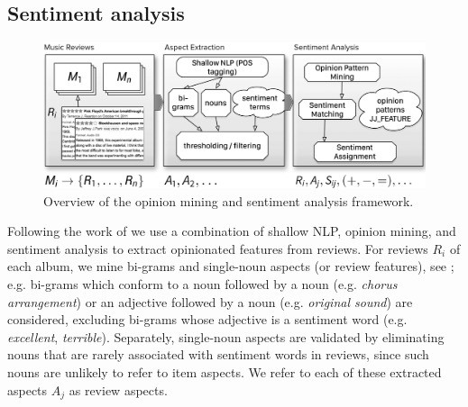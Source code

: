 \subsection{Sentiment analysis}
\label{sec:musicology:sentiment}

\begin{figure}
\includegraphics[width=\columnwidth]{ch05_musicology_pics/omf_bn.pdf}
\caption{Overview of the opinion mining and sentiment analysis framework.}
\label{fig:musicology:OMF}
\end{figure}

Following the work of \cite{DongSOS13,DongOS14} we use a combination of shallow NLP, opinion mining, and sentiment analysis to extract opinionated features from reviews. For reviews $R_{i}$ of each album, we mine bi-grams and single-noun aspects (or review features), see \cite{Hu2004}; e.g. bi-grams which conform to a noun followed by a noun (e.g. \emph{chorus arrangement}) or an adjective followed by a noun (e.g. \emph{original sound}) are considered, excluding bi-grams whose adjective is a sentiment word (e.g. \emph{excellent}, \emph{terrible}). Separately, single-noun aspects are validated by eliminating nouns that are rarely associated with sentiment words in reviews, since such nouns are unlikely to refer to item aspects. We refer to each of these extracted aspects $A_{j}$ as review aspects.

